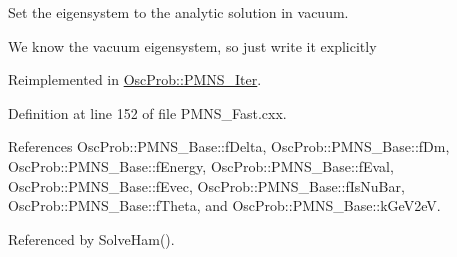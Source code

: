 Set the eigensystem to the analytic solution in vacuum.

We know the vacuum eigensystem, so just write it explicitly 

Reimplemented in \hyperlink{classOscProb_1_1PMNS__Iter_a39db92ee063e813ef68b3e0177778429}{Osc\+Prob\+::\+P\+M\+N\+S\+\_\+\+Iter}.



Definition at line 152 of file P\+M\+N\+S\+\_\+\+Fast.\+cxx.



References Osc\+Prob\+::\+P\+M\+N\+S\+\_\+\+Base\+::f\+Delta, Osc\+Prob\+::\+P\+M\+N\+S\+\_\+\+Base\+::f\+Dm, Osc\+Prob\+::\+P\+M\+N\+S\+\_\+\+Base\+::f\+Energy, Osc\+Prob\+::\+P\+M\+N\+S\+\_\+\+Base\+::f\+Eval, Osc\+Prob\+::\+P\+M\+N\+S\+\_\+\+Base\+::f\+Evec, Osc\+Prob\+::\+P\+M\+N\+S\+\_\+\+Base\+::f\+Is\+Nu\+Bar, Osc\+Prob\+::\+P\+M\+N\+S\+\_\+\+Base\+::f\+Theta, and Osc\+Prob\+::\+P\+M\+N\+S\+\_\+\+Base\+::k\+Ge\+V2eV.



Referenced by Solve\+Ham().


